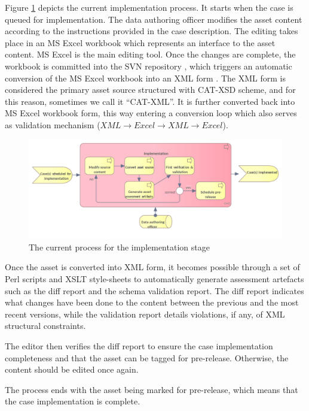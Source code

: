 	Figure \ref{fig:implementation-current} depicts the current implementation process. It starts when the case is queued for implementation. The data authoring officer modifies the asset content according to the instructions provided in the case description. The editing takes place in an MS Excel \citep{excel} workbook which represents an interface to the asset content. MS Excel is the main editing tool. Once the changes are complete, the workbook is committed into the SVN repository \citep{svn}, which triggers an automatic conversion of the MS Excel workbook into an XML form \cite{xml11-spec}. The XML form is considered the primary asset source structured with CAT-XSD scheme, and for this reason, sometimes we call it ``CAT-XML''. It is further converted back into MS Excel workbook form, this way entering a conversion loop which also serves as validation mechanism ($XML \rightarrow Excel \rightarrow XML \rightarrow Excel$).
	
	\begin{figure}[h]
		\centering
		\includegraphics[width=.9\textwidth]{images/business/current/Implementation.png}
		\caption{The current process for the implementation stage}
		\label{fig:implementation-current}
	\end{figure}
	
	Once the asset is converted into XML form, it becomes possible through a set of Perl scripts and XSLT style-sheets \citep{xslt3-Kay} to automatically generate assessment artefacts such as the diff report and the schema validation report. The diff report indicates what changes have been done to the content between the previous and the most recent versions, while the validation report details violations, if any, of XML structural constraints.
	
	The editor then verifies the diff report to ensure the case implementation completeness and that the asset can be tagged for pre-release. Otherwise, the content should be edited once again. 
	
	The process ends with the asset being marked for pre-release, which means that the case implementation is complete.
	
